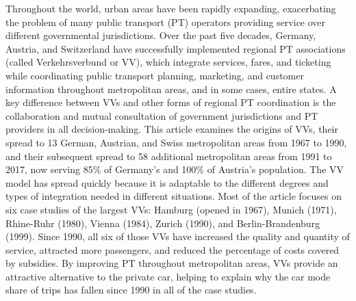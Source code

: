  Throughout the world, urban areas have been rapidly expanding, exacerbating the problem of many public transport (PT) operators providing service over different governmental jurisdictions. Over the past five decades, Germany, Austria, and Switzerland have successfully implemented regional PT associations (called Verkehrsverbund or VV), which integrate services, fares, and ticketing while coordinating public transport planning, marketing, and customer information throughout metropolitan areas, and in some cases, entire states. A key difference between VVs and other forms of regional PT coordination is the collaboration and mutual consultation of government jurisdictions and PT providers in all decision-making. This article examines the origins of VVs, their spread to 13 German, Austrian, and Swiss metropolitan areas from 1967 to 1990, and their subsequent spread to 58 additional metropolitan areas from 1991 to 2017, now serving 85\% of Germany's and 100\% of Austria's population. The VV model has spread quickly because it is adaptable to the different degrees and types of integration needed in different situations. Most of the article focuses on six case studies of the largest VVs: Hamburg (opened in 1967), Munich (1971), Rhine-Ruhr (1980), Vienna (1984), Zurich (1990), and Berlin-Brandenburg (1999). Since 1990, all six of those VVs have increased the quality and quantity of service, attracted more passengers, and reduced the percentage of costs covered by subsidies. By improving PT throughout metropolitan areas, VVs provide an attractive alternative to the private car, helping to explain why the car mode share of trips has fallen since 1990 in all of the case studies. 
